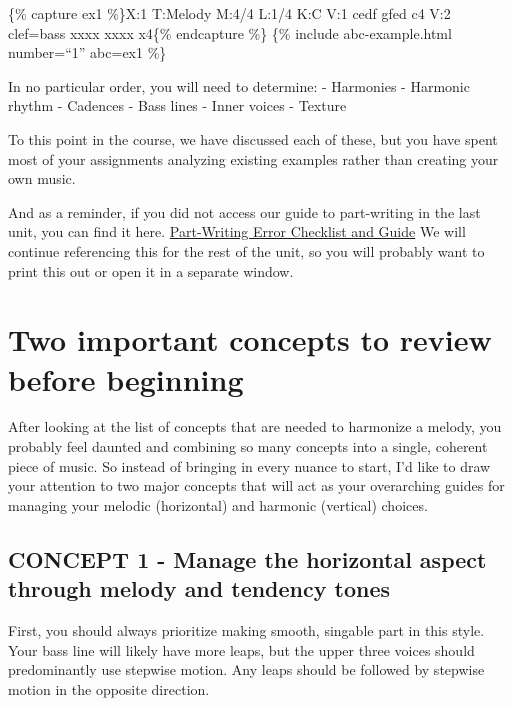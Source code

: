 \documentclass{book}
\begin{document}
\{\% capture ex1 \%\}X:1 T:Melody M:4/4 L:1/4 K:C V:1 cedf\textbar{}
gfed\textbar{} c4\textbar{]} V:2 clef=bass xxxx\textbar{} xxxx\textbar{}
x4\textbar{]}\{\% endcapture \%\} \{\% include abc-example.html number=``1''
abc=ex1 \%\}

In no particular order, you will need to determine: - Harmonies - Harmonic
rhythm - Cadences - Bass lines - Inner voices - Texture

To this point in the course, we have discussed each of these, but you have
spent most of your assignments analyzing existing examples rather than
creating your own music.

And as a reminder, if you did not access our guide to part-writing in the last
unit, you can find it here.
\href{https://docs.google.com/document/d/1s9Xd3LPqoaEevshTopxHzLX9jCzxVCZocOBLD_dceMU/edit?usp=sharing}{Part-Writing
Error Checklist and Guide} We will continue referencing this for the rest of
the unit, so you will probably want to print this out or open it in a separate
window.

\hypertarget{two-important-concepts-to-review-before-beginning}{%
\section{Two important concepts to review before
beginning}\label{two-important-concepts-to-review-before-beginning}}

After looking at the list of concepts that are needed to harmonize a melody,
you probably feel daunted and combining so many concepts into a single,
coherent piece of music. So instead of bringing in every nuance to start, I'd
like to draw your attention to two major concepts that will act as your
overarching guides for managing your melodic (horizontal) and harmonic
(vertical) choices.

\hypertarget{concept-1---manage-the-horizontal-aspect-through-melody-and-tendency-tones}{%
\subsection{CONCEPT 1 - Manage the horizontal aspect through melody and
tendency
tones}\label{concept-1---manage-the-horizontal-aspect-through-melody-and-tendency-tones}}

First, you should always prioritize making smooth, singable part in this
style. Your bass line will likely have more leaps, but the upper three voices
should predominantly use stepwise motion. Any leaps should be followed by
stepwise motion in the opposite direction.
\end{document}
